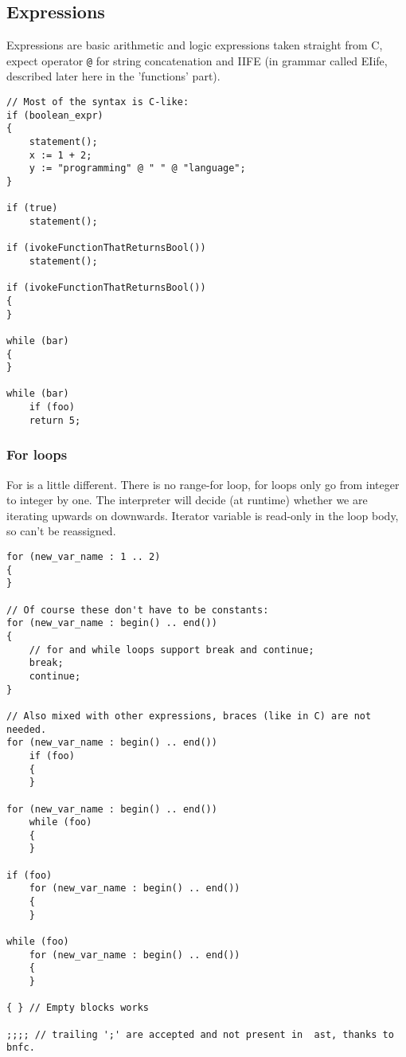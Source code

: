 \documentclass[11pt]{article}
\begin{document}
\subsection*{Expressions}
\label{sec:orgde17ba3}

Expressions are basic arithmetic and logic expressions taken straight from C,
expect operator \texttt{@} for string concatenation and IIFE (in grammar
called EIife, described later here in the 'functions' part).

\begin{verbatim}
// Most of the syntax is C-like:
if (boolean_expr)
{
    statement();
    x := 1 + 2;
    y := "programming" @ " " @ "language";
}

if (true)
    statement();

if (ivokeFunctionThatReturnsBool())
    statement();

if (ivokeFunctionThatReturnsBool())
{
}

while (bar)
{
}

while (bar)
    if (foo)
	return 5;
\end{verbatim}

\subsubsection*{For loops}
\label{sec:org95e50bb}
For is a little different. There is no range-for loop, for loops only go
from integer to integer by one. The interpreter will decide (at runtime)
whether we are iterating upwards on downwards. Iterator variable is
read-only in the loop body, so can't be reassigned.

\begin{verbatim}
for (new_var_name : 1 .. 2)
{
}

// Of course these don't have to be constants:
for (new_var_name : begin() .. end())
{
    // for and while loops support break and continue;
    break;
    continue;
}

// Also mixed with other expressions, braces (like in C) are not needed.
for (new_var_name : begin() .. end())
    if (foo)
    {
    }

for (new_var_name : begin() .. end())
    while (foo)
    {
    }

if (foo)
    for (new_var_name : begin() .. end())
    {
    }

while (foo)
    for (new_var_name : begin() .. end())
    {
    }

{ } // Empty blocks works

;;;; // trailing ';' are accepted and not present in  ast, thanks to bnfc.
\end{verbatim}
\end{document}
